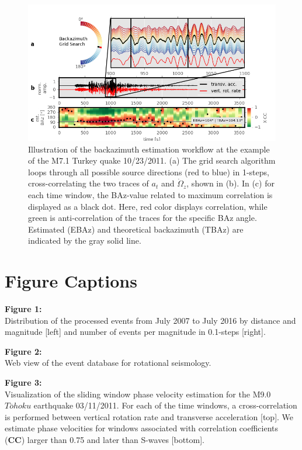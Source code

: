 \documentclass[12pt,reqno,letter]{article}
\begin{document}
\begin{figure}[!htp]
\centering
\includegraphics[width=\textwidth]{Baz_estimation.jpg}
\caption{Illustration of the backazimuth estimation workflow at the example of the M7.1 Turkey quake 10/23/2011. (a) The grid search algorithm loops through all possible source directions (red to blue) in 1\textdegree -steps, cross-correlating the two traces of $a_t$ and $\dot{\Omega}_z$, shown in (b). In (c) for each time window, the BAz-value related to maximum correlation is displayed as a black dot. Here, red color displays correlation, while green is anti-correlation of the traces for the specific BAz angle. Estimated (EBAz) and theoretical backazimuth (TBAz) are indicated by the gray solid line.}
\label{fig:baz}
\end{figure}

\clearpage
\section*{Figure Captions}

\noindent
\textbf{Figure 1:} \\
Distribution of the processed events from July 2007 to July 2016 by distance and magnitude [left] and number of events per magnitude in 0.1-steps [right].

\noindent
\textbf{Figure 2:} \\
Web view of the event database for rotational seismology.

\noindent
\textbf{Figure 3:} \\
Visualization of the sliding window phase velocity estimation for the M9.0 $T\overline{o}hoku$ earthquake 03/11/2011. For each of the time windows, a cross-correlation is performed between vertical rotation rate and transverse acceleration [top]. We estimate phase velocities for windows associated with correlation coefficients (\textbf{CC}) larger than 0.75 and later than S-waves [bottom].
\end{document}
